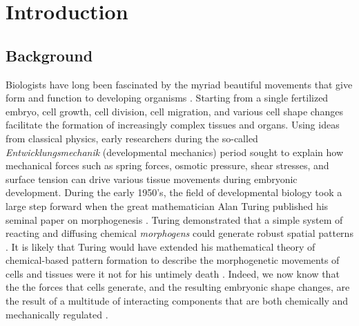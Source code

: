 \documentclass{ucetd}
\begin{document}
\chapter{Introduction}
\section{Background}
Biologists have long been fascinated by the myriad beautiful movements that give form and function to developing organisms \cite{Thompson:1917up}.  Starting from a single fertilized embryo, cell growth, cell division, cell migration, and various cell shape changes facilitate the formation of increasingly complex tissues and organs.  Using ideas from classical physics, early researchers during the so-called \textit{Entwicklungsmechanik} (developmental mechanics) period sought to explain how mechanical forces such as spring forces, osmotic pressure, shear stresses, and surface tension can drive various tissue movements during embryonic development.  During the early 1950's, the field of developmental biology took a large step forward when the great mathematician Alan Turing published his seminal paper on morphogenesis \cite{Turing:1952vn}.  Turing demonstrated that a simple system of reacting and diffusing chemical \textit{morphogens} could generate robust spatial patterns \cite{Turing:1952vn}.  It is likely that Turing would have extended his mathematical theory of chemical-based pattern formation to describe the morphogenetic movements of cells and tissues were it not for his untimely death \cite{Turing:1952vn, Howard:2011da}.  Indeed, we now know that the the forces that cells generate, and the resulting embryonic shape changes, are the result of a multitude of interacting components that are both chemically and mechanically regulated \cite{Mammoto:2010bt}.
\end{document}
